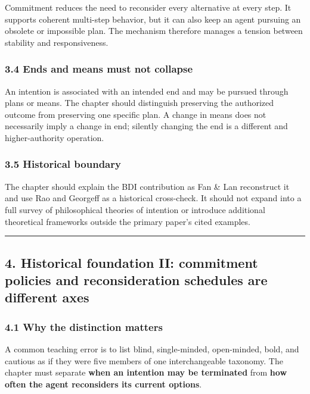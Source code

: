 Commitment reduces the need to reconsider every alternative at every step. It supports coherent multi-step behavior, but it can also keep an agent pursuing an obsolete or impossible plan. The mechanism therefore manages a tension between stability and responsiveness.

\subsubsection{3.4 Ends and means must not collapse}\label{ends-and-means-must-not-collapse}

An intention is associated with an intended end and may be pursued through plans or means. The chapter should distinguish preserving the authorized outcome from preserving one specific plan. A change in means does not necessarily imply a change in end; silently changing the end is a different and higher-authority operation.

\subsubsection{3.5 Historical boundary}\label{historical-boundary}

The chapter should explain the BDI contribution as Fan \& Lan reconstruct it and use Rao and Georgeff as a historical cross-check. It should not expand into a full survey of philosophical theories of intention or introduce additional theoretical frameworks outside the primary paper's cited examples.

\begin{center}\rule{0.5\linewidth}{0.5pt}\end{center}

\subsection{4. Historical foundation II: commitment policies and reconsideration schedules are different axes}\label{historical-foundation-ii-commitment-policies-and-reconsideration-schedules-are-different-axes}

\subsubsection{4.1 Why the distinction matters}\label{why-the-distinction-matters}

A common teaching error is to list blind, single-minded, open-minded, bold, and cautious as if they were five members of one interchangeable taxonomy. The chapter must separate \textbf{when an intention may be terminated} from \textbf{how often the agent reconsiders its current options}.

